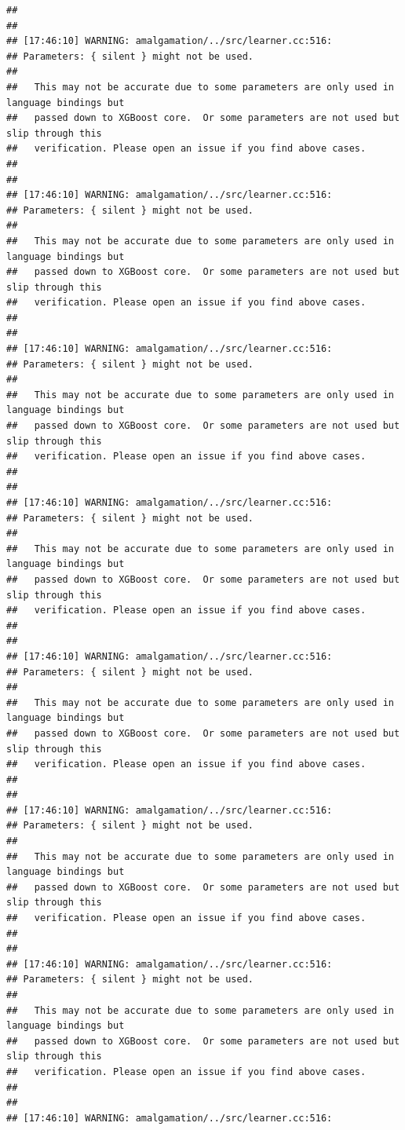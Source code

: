 \documentclass[AMS,STIX2COL]{WileyNJD-v2}\usepackage[]{graphicx}\usepackage[]{color}
\makeatletter
\newenvironment{kframe}{%
 \def\at@end@of@kframe{}%
 \ifinner\ifhmode%
  \def\at@end@of@kframe{\end{minipage}}%
  \begin{minipage}{\columnwidth}%
 \fi\fi%
 \def\FrameCommand##1{\hskip\@totalleftmargin \hskip-\fboxsep
 \colorbox{shadecolor}{##1}\hskip-\fboxsep
     \hskip-\linewidth \hskip-\@totalleftmargin \hskip\columnwidth}%
 \MakeFramed {\advance\hsize-\width
   \@totalleftmargin\z@ \linewidth\hsize
   \@setminipage}}%
 {\par\unskip\endMakeFramed%
 \at@end@of@kframe}
\newenvironment{knitrout}{}{} %
\makeatother
\begin{document}
\begin{knitrout}
\begin{kframe}
\begin{verbatim}
## 
## 
## [17:46:10] WARNING: amalgamation/../src/learner.cc:516: 
## Parameters: { silent } might not be used.
## 
##   This may not be accurate due to some parameters are only used in language bindings but
##   passed down to XGBoost core.  Or some parameters are not used but slip through this
##   verification. Please open an issue if you find above cases.
## 
## 
## [17:46:10] WARNING: amalgamation/../src/learner.cc:516: 
## Parameters: { silent } might not be used.
## 
##   This may not be accurate due to some parameters are only used in language bindings but
##   passed down to XGBoost core.  Or some parameters are not used but slip through this
##   verification. Please open an issue if you find above cases.
## 
## 
## [17:46:10] WARNING: amalgamation/../src/learner.cc:516: 
## Parameters: { silent } might not be used.
## 
##   This may not be accurate due to some parameters are only used in language bindings but
##   passed down to XGBoost core.  Or some parameters are not used but slip through this
##   verification. Please open an issue if you find above cases.
## 
## 
## [17:46:10] WARNING: amalgamation/../src/learner.cc:516: 
## Parameters: { silent } might not be used.
## 
##   This may not be accurate due to some parameters are only used in language bindings but
##   passed down to XGBoost core.  Or some parameters are not used but slip through this
##   verification. Please open an issue if you find above cases.
## 
## 
## [17:46:10] WARNING: amalgamation/../src/learner.cc:516: 
## Parameters: { silent } might not be used.
## 
##   This may not be accurate due to some parameters are only used in language bindings but
##   passed down to XGBoost core.  Or some parameters are not used but slip through this
##   verification. Please open an issue if you find above cases.
## 
## 
## [17:46:10] WARNING: amalgamation/../src/learner.cc:516: 
## Parameters: { silent } might not be used.
## 
##   This may not be accurate due to some parameters are only used in language bindings but
##   passed down to XGBoost core.  Or some parameters are not used but slip through this
##   verification. Please open an issue if you find above cases.
## 
## 
## [17:46:10] WARNING: amalgamation/../src/learner.cc:516: 
## Parameters: { silent } might not be used.
## 
##   This may not be accurate due to some parameters are only used in language bindings but
##   passed down to XGBoost core.  Or some parameters are not used but slip through this
##   verification. Please open an issue if you find above cases.
## 
## 
## [17:46:10] WARNING: amalgamation/../src/learner.cc:516: 

\end{verbatim}
\end{kframe}
\end{knitrout}
\end{document}
